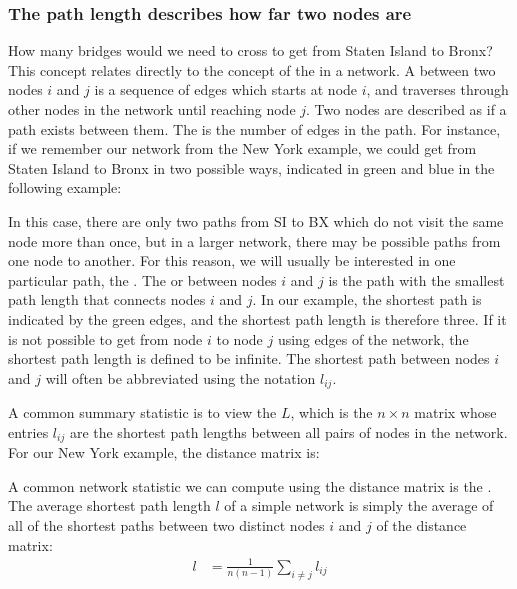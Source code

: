 \documentclass[letterpaper,10pt,english]{jupyterBook}
\begin{document}
\subsubsection{The path length describes how far two nodes are}
\label{\detokenize{representations/ch4/properties-of-networks:the-path-length-describes-how-far-two-nodes-are}}
\sphinxAtStartPar
How many bridges would we need to cross to get from Staten Island to Bronx? This concept relates directly to the concept of the  in a network. A  between two nodes \(i\) and \(j\) is a sequence of edges which starts at node \(i\), and traverses through other nodes in the network until reaching node \(j\). Two nodes are described as  if a path exists between them. The  is the number of edges in the path. For instance, if we remember our network from the New York example, we could get from Staten Island to Bronx in two possible ways, indicated in green and blue in the following example:

\noindent{}

\sphinxAtStartPar
In this case, there are only two paths from SI to BX which do not visit the same node more than once, but in a larger network, there may be  possible paths from one node to another. For this reason, we will usually be interested in one particular path, the . The  or  between nodes \(i\) and \(j\) is the path with the smallest path length that connects nodes \(i\) and \(j\). In our example, the shortest path is indicated by the green edges, and the shortest path length is therefore three.  If it is not possible to get from node \(i\) to node \(j\) using edges of the network, the shortest path length is defined to be infinite. The shortest path between nodes \(i\) and \(j\) will often be abbreviated using the notation \(l_{ij}\).

\sphinxAtStartPar
A common summary statistic is to view the  \(L\), which is the \(n \times n\) matrix whose entries \(l_{ij}\) are the shortest path lengths between all pairs of nodes in the network. For our New York example, the distance matrix is:

\noindent{}

\sphinxAtStartPar
A common network statistic we can compute using the distance matrix is the . The average shortest path length \(l\) of a simple network is simply the average of all of the shortest paths between two distinct nodes \(i\) and \(j\) of the distance matrix:
\begin{align*}
    l &= \frac{1}{n(n - 1)}\sum_{i \neq j} l_{ij}
\end{align*}
\end{document}
